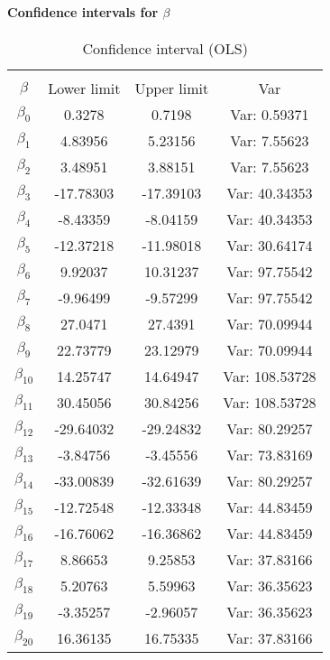 \documentclass[a4paper]{article}
\begin{document}
\paragraph{Confidence intervals for $\beta$}

 

\begin{table}[h!]
\caption{Confidence interval (OLS)}
\begin{center}
\begin{tabular}{cccc}
	\hline
	\multicolumn{4}{c}{}\\
	$\beta$ & Lower limit & Upper limit & Var\\
	\hline
	$\beta_{0}$ & 0.3278 & 0.7198 & Var: 0.59371 \\
	$\beta_{1}$ & 4.83956 & 5.23156 & Var: 7.55623 \\
	$\beta_{2}$ & 3.48951 & 3.88151 & Var: 7.55623 \\
	$\beta_{3}$ & -17.78303 & -17.39103 & Var: 40.34353 \\
	$\beta_{4}$ & -8.43359 & -8.04159 & Var: 40.34353 \\
	$\beta_{5}$ & -12.37218 & -11.98018 & Var: 30.64174 \\
	$\beta_{6}$ & 9.92037 & 10.31237 & Var: 97.75542 \\
	$\beta_{7}$ & -9.96499 & -9.57299 & Var: 97.75542 \\
	$\beta_{8}$ & 27.0471 & 27.4391 & Var: 70.09944 \\
	$\beta_{9}$ & 22.73779 & 23.12979 & Var: 70.09944 \\
	$\beta_{10}$ & 14.25747 & 14.64947 & Var: 108.53728 \\
	$\beta_{11}$ & 30.45056 & 30.84256 & Var: 108.53728 \\
	$\beta_{12}$ & -29.64032 & -29.24832 & Var: 80.29257 \\
	$\beta_{13}$ & -3.84756 & -3.45556 & Var: 73.83169 \\
	$\beta_{14}$ & -33.00839 & -32.61639 & Var: 80.29257 \\
	$\beta_{15}$ & -12.72548 & -12.33348 & Var: 44.83459 \\
	$\beta_{16}$ & -16.76062 & -16.36862 & Var: 44.83459 \\
	$\beta_{17}$ & 8.86653 & 9.25853 & Var: 37.83166 \\
	$\beta_{18}$ & 5.20763 & 5.59963 & Var: 36.35623 \\
	$\beta_{19}$ & -3.35257 & -2.96057 & Var: 36.35623 \\
	$\beta_{20}$ & 16.36135 & 16.75335 & Var: 37.83166 \\
\end{tabular}
\end{center}
\label{tab:ConIntOLS}
\end{table}
\end{document}
